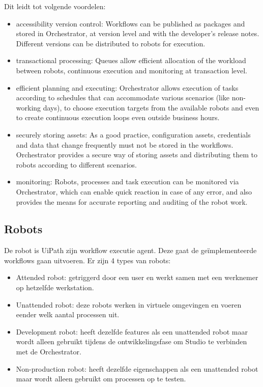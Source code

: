 Dit leidt tot volgende voordelen:
\begin{itemize}
	\item accessibility version control: Workflows can be published as packages and stored in Orchestrator, at version level and with the developer's release notes. Different versions can be distributed to robots for execution.
	\item transactional processing: Queues allow efficient allocation of the workload between robots, continuous execution and monitoring at transaction level.
	\item efficient planning and executing: Orchestrator allows execution of tasks according to schedules that can accommodate various scenarios (like non-working days), to choose execution targets from the available robots and even to create continuous execution loops even outside business hours.
	\item securely storing assets: As a good practice, configuration assets, credentials and data that change frequently must not be stored in the workflows. Orchestrator provides a secure way of storing assets and distributing them to robots according to different scenarios.
	\item monitoring: Robots, processes and task execution can be monitored via Orchestrator, which can enable quick reaction in case of any error, and also provides the means for accurate reporting and auditing of the robot work.
\end{itemize}

\subsection{Robots}
De robot is UiPath zijn workflow executie agent. Deze gaat de geïmplementeerde workflows gaan uitvoeren. Er zijn 4 types van robots:
\begin{itemize}
	\item Attended robot: getriggerd door een user en werkt samen met een werknemer op hetzelfde werkstation.
	\item Unattended robot: deze robots werken in virtuele omgevingen en voeren eender welk aantal processen uit.
	\item Development robot: heeft dezelfde features als een unattended robot maar wordt alleen gebruikt tijdens de ontwikkelingsfase om Studio te verbinden met de Orchestrator.
	\item Non-production robot: heeft dezelfde eigenschappen als een unattended robot maar wordt alleen gebruikt om processen op te testen.
\end{itemize}

